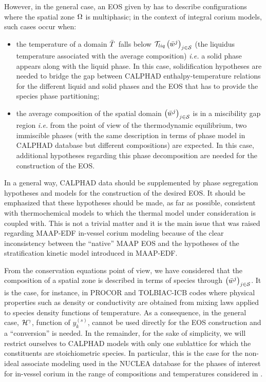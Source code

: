 However, in the general case, an EOS given by  has to describe configurations where the spatial zone $\Omega_{}$ is multiphasic; in the context of integral corium models, such cases occur when:
\begin{itemize}
\item the temperature of a domain $\avTemperature{}$ falls below $\Mc{T}_{liq}\left(\avMassFraction[j]{}\right)_{j\in \speciesSet}$ (the liquidus temperature associated with the average composition) \textit{i.e.} a solid phase appears along with the liquid phase. In this case, solidification hypotheses are needed to bridge the gap between CALPHAD enthalpy-temperature relations for the different liquid and solid phases and the EOS that has to provide the species phase partitioning;
\item the average composition of the spatial domain $\left(\avMassFraction[j]{}\right)_{j\in \speciesSet}$ is in a miscibility gap region \textit{i.e.} from the point of view of the thermodynamic equilibrium, two immiscible phases (with the same description in terms of phase model in CALPHAD database but different compositions) are expected. In this case, additional hypotheses regarding this phase decomposition are needed for the construction of the EOS.
\end{itemize}
In a general way, CALPHAD data should be supplemented by phase segregation hypotheses and models for the construction of the desired EOS. It should be emphasized that these hypotheses should be made, as far as possible, consistent with thermochemical models to which the thermal model under consideration is coupled with. This is not a trivial matter and it is the main issue that was raised regarding MAAP-EDF in-vessel corium modeling because of the clear inconsistency between the ``native'' MAAP EOS and the hypotheses of the stratification kinetic model introduced in MAAP-EDF. 
\begin{remark}
From the conservation equations point of view, we have considered that the composition of a spatial zone is described in terms of species through $\left(\avMassFraction[j]{}\right)_{j\in \speciesSet}$. It is the case, for instance, in PROCOR and TOLBIAC-ICB \cite{Spindler2006} codes where physical properties such as density or conductivity are obtained from mixing laws applied to species density functions of temperature. 
As a consequence, in the general case, ${\mathcal H}^{\gamma}$, function of $y_{k}^{(s)}$, cannot be used directly for the EOS construction and a ``conversion'' is needed. In the remainder, for the sake of simplicity, we will restrict ourselves to CALPHAD models with only one sublattice for which the constituents are stoichiometric species. In particular, this is the case for the non-ideal associate modeling used in the NUCLEA database \cite{Cheynet2002} for the phases of interest for in-vessel corium in the range of compositions and temperatures considered in .
\end{remark}

